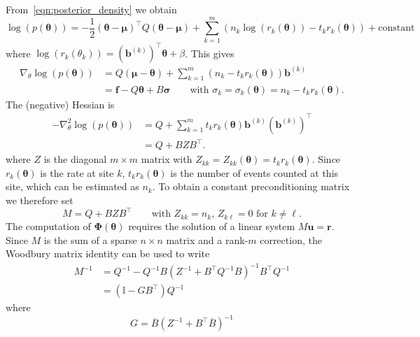\documentclass[11pt]{article}
\renewcommand{\vec}[1]{\boldsymbol{#1}}
\begin{document}
From~\eqref{eqn:posterior_density} we obtain
\begin{equation}
\log(p(\vec{\theta})) = -\frac{1}{2} (\vec{\theta}-\vec{\mu})^\top Q (\vec{\theta}-\vec{\mu}) + \sum_{k=1}^{m} \left(n_k\log(r_k(\vec{\theta})) - t_k r_k(\vec{\theta})\right) + \text{constant}
\end{equation}
where $\log(r_k(\theta_k)) = (\vec{b}^{(k)})^\top \vec{\theta} +\beta$. This gives
\begin{equation}
    \begin{aligned}
\nabla_\theta \log(p(\vec{\theta})) &= Q(\vec{\mu}-\vec{\theta}) + \sum_{k=1}^{m} \left(n_k - t_k r_k(\vec{\theta})\right)\vec{b}^{(k)}\\
&= \vec{f}-Q\vec{\theta} + B \vec{\sigma}
\qquad\text{with $\sigma_k=\sigma_k(\vec{\theta}) = n_k - t_k r_k(\vec{\theta})$}.
    \end{aligned}
\end{equation}
The (negative) Hessian is 
\begin{equation}
    \begin{aligned}
-\nabla^2_\theta \log(p(\vec{\theta})) &= Q + \sum_{k=1}^{m} t_k r_k(\vec{\theta})\vec{b}^{(k)} (\vec{b}^{(k)})^\top\\
&= Q + B Z B^\top.
    \end{aligned}
\end{equation}
where $Z$ is the diagonal $m\times m$ matrix with $Z_{kk} = Z_{kk}(\vec{\theta}) = t_k r_k(\vec{\theta})$. Since $r_k(\vec{\theta})$ is the rate at site $k$, $t_kr_k(\vec{\theta})$ is the number of events counted at this site, which can be estimated as $n_k$. To obtain a constant preconditioning matrix we therefore set
\begin{equation}
M = Q + B Z B^\top\qquad\text{with $Z_{kk} = n_k$, $Z_{k\ell}=0$ for $k\neq \ell$.}
\end{equation}
The computation of $\vec{\Phi}(\vec{\theta})$ requires the solution of a linear system $M \vec{u} = \vec{r}$. Since $M$ is the sum of a sparse $n\times n$ matrix and a rank-$m$ correction, the Woodbury matrix identity can be used to write
\begin{equation}
    \begin{aligned}
M^{-1} &= Q^{-1} - Q^{-1} B\left(Z^{-1} + B^\top Q^{-1} B\right)^{-1} B^\top Q^{-1}\\
&= \left(\mathbb{I} - GB^\top\right) Q^{-1}
    \end{aligned}
\end{equation}
where
\begin{equation}
G = \overline{B} \left(Z^{-1} + B^\top \overline{B}\right)^{-1}\label{eqn:def_G}
\end{equation}
\end{document}
